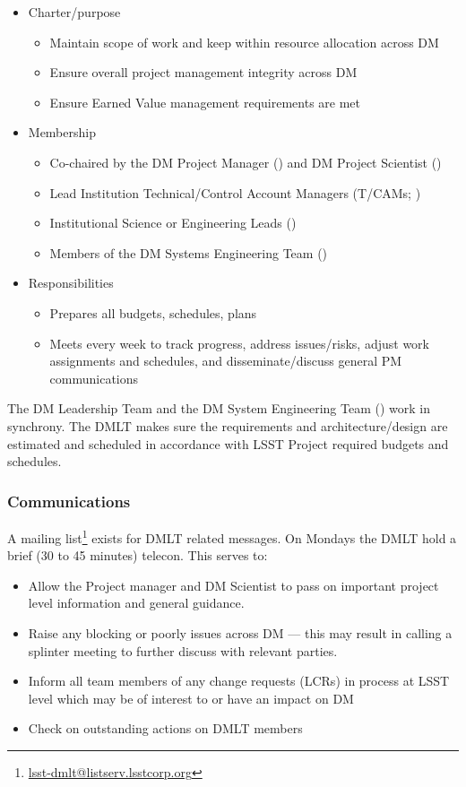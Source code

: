 \begin{itemize}
\item Charter/purpose
	\begin{itemize}
	\item Maintain scope of work and keep within resource allocation across DM
	\item Ensure overall project management integrity across DM
	\item Ensure Earned Value management requirements are met
	\end{itemize}
\item Membership
	\begin{itemize}
	\item Co-chaired by the DM Project Manager () and DM Project Scientist ()
	\item Lead Institution Technical/Control Account Managers (T/CAMs; )
	\item Institutional Science or Engineering Leads ()
	\item Members of the DM Systems Engineering Team ()
	\end{itemize}
\item Responsibilities
	\begin{itemize}
	\item Prepares all budgets, schedules, plans
	\item Meets every week to track progress, address issues/risks, adjust work assignments and schedules, and disseminate/discuss general PM communications
	\end{itemize}
\end{itemize}

The DM Leadership Team and the DM System Engineering Team () work in synchrony.
The DMLT makes sure the requirements and architecture/design are estimated and scheduled in accordance with LSST Project required budgets and schedules.

 \subsubsection{Communications}
A mailing list\footnote{\url{lsst-dmlt@listserv.lsstcorp.org}} exists for DMLT related messages.
On Mondays the DMLT hold a brief (30 to 45 minutes) telecon. This serves to:

\begin{itemize}
\item Allow the Project manager and DM Scientist  to pass on important project level information and general guidance.
\item Raise any blocking or poorly issues across DM --- this may result in calling a splinter meeting to further discuss with relevant parties.
\item Inform all team members of any change requests (LCRs) in process at LSST level which may be of interest to or have an impact on DM
\item Check on outstanding actions on DMLT members
\end{itemize}

